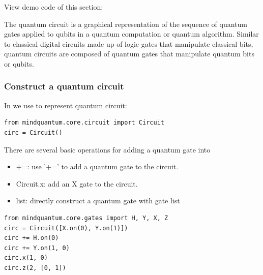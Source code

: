 View demo code of this section: 

The quantum circuit is a graphical representation of the sequence of quantum gates applied to qubits in a quantum computation or quantum algorithm. Similar to classical digital circuits made up of logic gates that manipulate classical bits, quantum circuits are composed of quantum gates that manipulate quantum bits or qubits.

\subsubsection{Construct a quantum circuit}
In \MindQuantum we use \Circuit to represent quantum circuit:

\begin{lstlisting}
from mindquantum.core.circuit import Circuit
circ = Circuit()
\end{lstlisting}

There are several basic operations for adding a quantum gate into \Circuit
\begin{itemize}
    \item +=: use '+=' to add a quantum gate to the circuit.
    \item Circuit.x: add an X gate to the circuit.
    \item list: directly construct a quantum gate with gate list
\end{itemize}
\begin{lstlisting}
from mindquantum.core.gates import H, Y, X, Z
circ = Circuit([X.on(0), Y.on(1)])
circ += H.on(0)
circ += Y.on(1, 0)
circ.x(1, 0)
circ.z(2, [0, 1])
\end{lstlisting}

